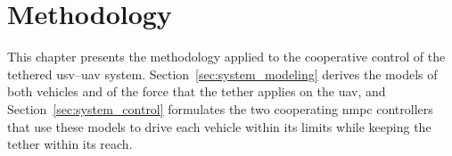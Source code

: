 
\chapter{Methodology}
\label{chapter:methodology}

This chapter presents the methodology applied to the cooperative control of the tethered \gls{usv}--\gls{uav} system. Section~\ref{sec:system_modeling} derives the models of both vehicles and of the force that the tether applies on the \gls{uav}, and Section~\ref{sec:system_control} formulates the two cooperating \gls{nmpc} controllers that use these models to drive each vehicle within its limits while keeping the tether within its reach.


